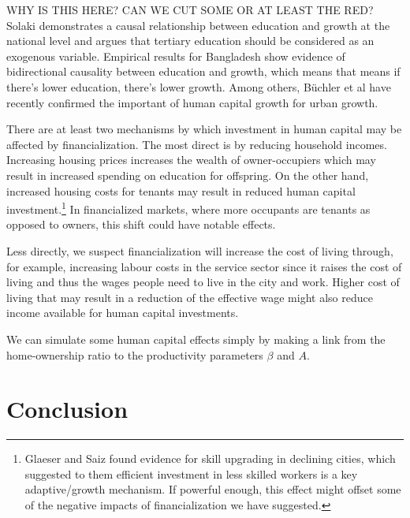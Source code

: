 WHY IS THIS HERE? CAN WE CUT SOME OR AT LEAST THE RED? 
Solaki \cite{solakiRelationshipEducationGDP2013} demonstrates a causal relationship between education and growth at the national level {\color{red}and argues that tertiary education should be considered as an exogenous variable.}  Empirical results for Bangladesh \cite{islam2007relationship} show evidence of bidirectional causality between education and growth, which means that means if there's lower education, there's lower growth.  Among others, B\"uchler et al have recently confirmed the important of human capital growth for urban growth.

There are at least two mechanisms by which investment in human capital may be affected by financialization. The most direct is by reducing household incomes. Increasing housing prices increases the wealth of owner-occupiers which may result in increased spending on education for offspring. On the other hand, increased housing costs for tenants may result in reduced human capital investment.\footnote{Glaeser and Saiz found evidence for skill upgrading in declining cities, which suggested to them efficient investment in less skilled workers is a key adaptive/growth mechanism. If powerful enough, this effect might offset some of the negative impacts of financialization we have suggested.} %
In financialized markets, where more occupants are tenants as opposed to owners, this shift could have notable effects. 

Less directly, we suspect financialization will increase the cost of living through, for example, increasing labour costs in the service sector since it raises the cost of living and thus the wages people need to live in the city and work. Higher cost of living that may result in a reduction of the effective wage might also reduce income available for human capital investments. %

We can simulate some human capital effects simply by making a link from the home-ownership ratio to the productivity parameters  $\beta$ and $A$. 



\section{Conclusion}

